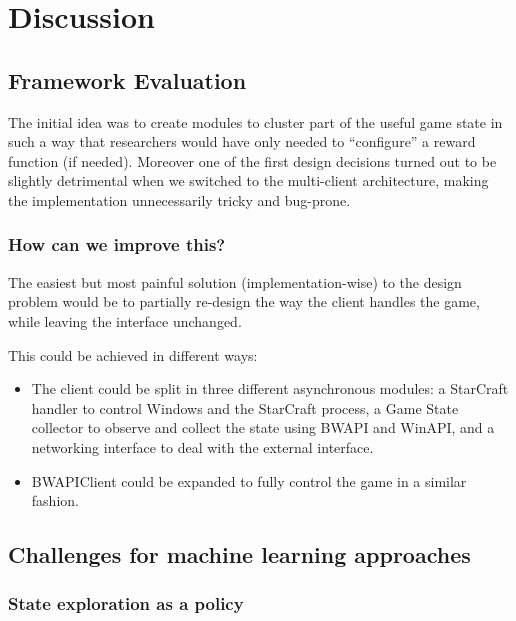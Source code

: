 
\chapter{Discussion}

\section{Framework Evaluation}

The initial idea was to create modules to cluster part of the useful game state
in such a way that researchers would have only needed to ``configure'' a reward
function (if needed). Moreover one of the first design decisions turned out to
be slightly detrimental when we switched to the multi-client architecture,
making the implementation unnecessarily tricky and bug-prone.

\subsection{How can we improve this?}

The easiest but most painful solution (implementation-wise) to the design
problem would be to partially re-design the way the client handles the game,
while leaving the interface unchanged.

This could be achieved in different ways:

\begin{itemize}
\item The client could be split in three different asynchronous modules: a
  StarCraft handler to control Windows and the StarCraft process, a Game State
  collector to observe and collect the state using BWAPI and WinAPI, and a
  networking interface to deal with the external interface.
\item BWAPIClient could be expanded to fully control the game in a similar
  fashion.
\end{itemize}

\section{Challenges for machine learning approaches}

\subsection{State exploration as a policy}

